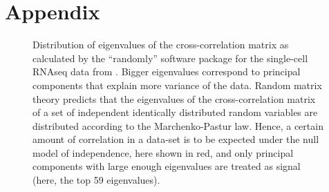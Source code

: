 \documentclass[review]{elsarticle}
\begin{document}
\section*{Appendix}
\renewcommand{\thefigure}{S\arabic{figure}}
\setcounter{figure}{0}
\renewcommand{\thesection}{S}

\begin{figure}
\centering
{}
\caption{Distribution of eigenvalues of the cross-correlation matrix as calculated by the ``randomly'' software package \cite{Aparicio2018} for the single-cell RNAseq data from \cite{Morrison2017}. Bigger eigenvalues correspond to principal components that explain more variance of the data. Random matrix theory predicts that the eigenvalues of the cross-correlation matrix of a set of independent identically distributed random variables are distributed according to the Marchenko-Pastur law. Hence, a certain amount of correlation in a data-set is to be expected under the null model of independence, here shown in red, and only principal components with large enough eigenvalues are treated as signal (here, the top 59 eigenvalues). \label{figMP}}
\end{figure}
\end{document}
